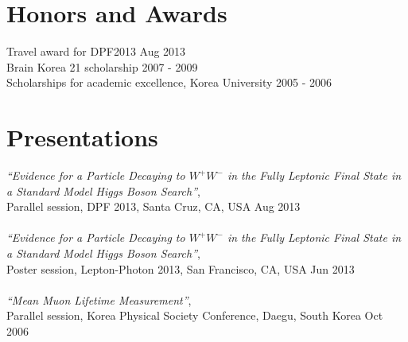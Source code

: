 \documentclass[margin]{res}
\begin{document}
\begin{resume}
\section{Honors and Awards} 
Travel award for DPF2013                                \hfill Aug 2013 \\
Brain Korea 21 scholarship                              \hfill 2007 - 2009 \\
Scholarships for academic excellence, Korea University  \hfill 2005 - 2006 \\


\section{Presentations } 
\textit{``Evidence for a Particle Decaying to $W^+W^-$ in the Fully Leptonic Final State 
in a Standard Model Higgs Boson Search''}, \\ 
Parallel session, DPF 2013, Santa Cruz, CA, USA  
\hfill{Aug 2013}
\\
\\
\textit{``Evidence for a Particle Decaying to $W^+W^-$ in the Fully Leptonic Final State 
in a Standard Model Higgs Boson Search''}, \\
Poster session, Lepton-Photon 2013, San Francisco, CA, USA  
\hfill{Jun 2013}
\\
\\
\textit{``Mean Muon Lifetime Measurement''}, \\
Parallel session, Korea Physical Society Conference, Daegu, South Korea  
\hfill{Oct 2006}




\end{resume}
\end{document}
